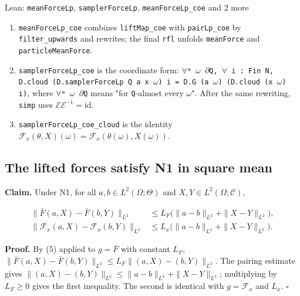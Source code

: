 \documentclass[11pt,a4paper]{report}
\begin{document}
\begin{leanbox}{Lean: \texttt{meanForceLp}, \texttt{samplerForceLp}, \texttt{meanForceLp\_\allowbreak{}coe} and 2 more}
\begin{enumerate}


\item \texttt{mean\allowbreak{}Force\allowbreak{}Lp\_\allowbreak{}coe} combines \texttt{lift\allowbreak{}Map\_\allowbreak{}coe} with \texttt{pair\allowbreak{}Lp\_\allowbreak{}coe} by \texttt{filter\_\allowbreak{}upwards} and rewrites; the final \texttt{rfl} unfolds \texttt{mean\allowbreak{}Force} and \texttt{particle\allowbreak{}Mean\allowbreak{}Force}.

\item \texttt{sampler\allowbreak{}Force\allowbreak{}Lp\_\allowbreak{}coe} is the coordinate form: \texttt{\ensuremath{\forall}ᵐ \ensuremath{\omega} \ensuremath{\partial}Q, \ensuremath{\forall} i : Fin N, D.\allowbreak{}cloud (D.\allowbreak{}sampler\allowbreak{}Force\allowbreak{}Lp Q a x \ensuremath{\omega}) i = D.\allowbreak{}G (a \ensuremath{\omega}) (D.\allowbreak{}cloud (x \ensuremath{\omega}) i)}, where \texttt{\ensuremath{\forall}ᵐ \ensuremath{\omega} \ensuremath{\partial}Q} means "for \texttt{Q}-almost every \(\omega\)". After the same rewriting, \texttt{simp} uses \(\mathcal E\mathcal E^{-1}=\mathrm{id}\).

\item \texttt{sampler\allowbreak{}Force\allowbreak{}Lp\_\allowbreak{}coe\_\allowbreak{}cloud} is the identity \(\mathcal F_x(\theta,X)(\omega)=\mathcal F_x(\theta(\omega),X(\omega))\).

\end{enumerate}
\end{leanbox}
\subsection{\texorpdfstring{The lifted forces satisfy N1 in square mean}{The lifted forces satisfy N1 in square mean}}


\textbf{Claim.} Under N1, for all \(a,b\in L^2(\Omega;\Theta)\) and \(X,Y\in L^2(\Omega;\mathcal C)\),


\[\begin{aligned}\bigl\|\bar F(a,X)-\bar F(b,Y)\bigr\|_{L^2}&\le L_F\bigl(\|a-b\|_{L^2}+\|X-Y\|_{L^2}\bigr),\\ \bigl\|\mathcal F_x(a,X)-\mathcal F_x(b,Y)\bigr\|_{L^2}&\le L_x\bigl(\|a-b\|_{L^2}+\|X-Y\|_{L^2}\bigr).\end{aligned}\]


\textbf{Proof.} By (5) applied to \(g=\bar F\) with constant \(L_F\), \(\|\bar F(a,X)-\bar F(b,Y)\|_{L^2}\le L_F\|(a,X)-(b,Y)\|_{L^2}\). The pairing estimate gives \(\|(a,X)-(b,Y)\|_{L^2}\le\|a-b\|_{L^2}+\|X-Y\|_{L^2}\); multiplying by \(L_F\ge0\) gives the first inequality. The second is identical with \(g=\mathcal F_x\) and \(L_x\). \(\square\)
\end{document}

